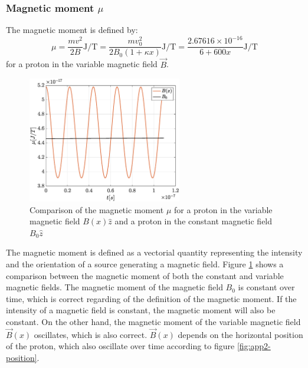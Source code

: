 \documentclass[a4paper,12pt,twoside]{article}
\begin{document}
\subsubsection{Magnetic moment $\mu$} %

The magnetic moment is defined by:
\begin{equation}
\mu = \frac{mv^2}{2B} \si{\joule \per \tesla} = \frac{mv_0^2}{2B_0(1+\kappa x)} \si{\joule \per \tesla} = \frac{2.67616 \times 10^{-16}}{6+600x} \si{\joule \per \tesla}
\end{equation}
for a proton in the variable magnetic field $\vec{B}$.

\begin{figure}[h]
\centering
	\includegraphics[width=0.60\textwidth]{graphs/mu.eps}
	\caption{Comparison of the magnetic moment $\mu$ for a proton in the variable magnetic field $B(x)\hat{z}$ and a proton in the constant magnetic field $B_0\hat{z}$}
	\label{fig:mu}
\end{figure}

The magnetic moment is defined as a vectorial quantity representing the intensity and the orientation of a source generating a magnetic field.\cite{wiki:magnetic-moment}
Figure \ref{fig:mu} shows a comparison between the magnetic moment of both the constant and variable magnetic fields.
The magnetic moment of the magnetic field $B_0$ is constant over time, which is correct regarding of the definition of the magnetic moment.
If the intensity of a magnetic field is constant, the magnetic moment will also be constant.
On the other hand, the magnetic moment of the variable magnetic field $\vec{B}(x)$ oscillates, which is also correct.
$\vec{B}(x)$ depends on the horizontal position of the proton, which also oscillate over time according to figure \ref{fig:app2-position}. 
\end{document}
